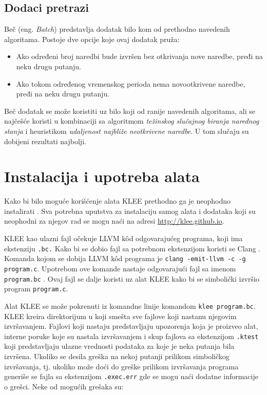 \documentclass[12pt,oneside]{memoir}
\begin{document}
\subsection{Dodaci pretrazi} 
Beč (eng. \textit{Batch}) predstavlja dodatak bilo kom od prethodno navedenih algoritama. Postoje dve opcije koje ovaj dodatak pruža:
\begin{itemize}
    \item Ako određeni broj naredbi bude izvršen bez otkrivanja nove naredbe, pređi na neku drugu putanju.
    
    \item Ako tokom određenog vremenskog perioda nema novootkrivene naredbe, pređi na neku drugu putanju.
\end{itemize}
Beč dodatak se može koristiti uz bilo koji od ranije navedenih algoritama, ali se najčešće koristi u kombinaciji sa algoritmom \textit{težinskog slučajnog biranja narednog stanja} i heuristikom \textit{udaljenost najbliže neotkrivene naredbe}. U tom slučaju su dobijeni rezultati najbolji.

\section{Instalacija i upotreba alata} \label{instalacija}

Kako bi bilo moguće korišćenje alata KLEE prethodno ga je neophodno instalirati . Sva potrebna uputstva za instalaciju samog alata i dodataka koji su neophodni za njegov rad se mogu naći na adresi \url{http://klee.github.io}.

KLEE kao ulazni fajl očekuje LLVM \cite{llvm} k\^od odgovarajućeg programa, koji ima ekstenziju \texttt{.bc.} Kako bi se dobio fajl sa potrebnom ekstenzijom koristi se Clang \cite{clang}. Komanda kojom se dobija LLVM k\^od programa je \texttt{clang -emit-llvm -c -g program.c}. Upotrebom ove komande nastaje odgovarajući fajl sa imenom \texttt{program.bc} . Ovaj fajl se dalje koristi uz alat KLEE kako bi se simbolički izvršio program \texttt{program.c}.

Alat KLEE se može pokrenuti iz komandne linije komandom \texttt{klee program.bc}. KLEE kreira direktorijum u koji smešta sve fajlove koji nastanu njegovim izvršavanjem. Fajlovi koji nastaju predstavljaju upozorenja koja je proizveo alat, interne poruke koje su nastala izvršavanjem i skup fajlova sa ekstenzijom \texttt{.ktest} koji predstavljaju ulazne vrednosti podataka za koje je neka putanja bila izvršena. Ukoliko se desila greška na nekoj putanji prilikom simboličkog izvršavanja, tj. ukoliko može doći do greške prilikom izvršavanja programa generiše se fajla sa ekstenzijom \texttt{.exec.err} gde se mogu naći dodatne informacije o grešci. Neke od mogućih grešaka su:
\end{document}
